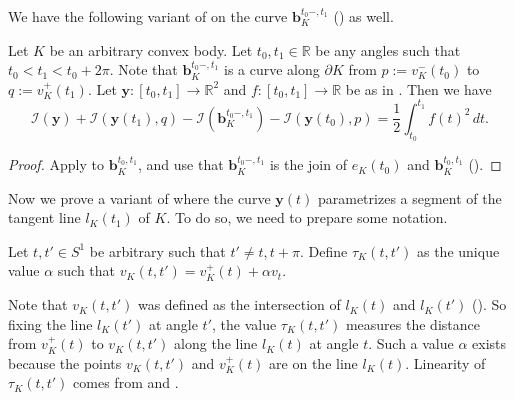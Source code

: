 We have the following variant of  on the curve \(\mathbf{b}_K^{t_0 -, t_1}\) () as well.

\begin{theorem}

Let \(K\) be an arbitrary convex body. Let \(t_0, t_1 \in \mathbb{R}\) be any angles such that \(t_0 < t_1 < t_0 + 2 \pi\). Note that \(\mathbf{b}_K^{t_0 -, t_1}\) is a curve along \(\partial K\) from \(p := v_K^-(t_0)\) to \(q := v_K^+(t_1)\). Let \(\mathbf{y} : [t_0, t_1] \to \mathbb{R}^2\) and \(f : [t_0, t_1] \to \mathbb{R}\) be as in . Then we have
\[
\mathcal{I}(\mathbf{y}) + \mathcal{I} \left( \mathbf{y}(t_1), q \right) - \mathcal{I}(\mathbf{b}_K^{t_0 -, t_1}) - \mathcal{I} \left( \mathbf{y}(t_0), p \right) =  \frac{1}{2}\int_{t_0}^{t_1} f(t) ^2 \, dt.
\]

\label{thm:mamikon-closed}
\end{theorem}

\begin{proof}
Apply  to \(\mathbf{b}_K^{t_0, t_1}\), and use that \(\mathbf{b}_{K}^{t_0 -, t_1}\) is the join of \(e_{K}(t_0)\) and \(\mathbf{b}_K^{t_0, t_1}\) ().
\end{proof}

Now we prove a variant of  where the curve \(\mathbf{y}(t)\) parametrizes a segment of the tangent line \(l_K(t_1)\) of \(K\). To do so, we need to prepare some notation.

\begin{definition}

Let \(t, t' \in S^1\) be arbitrary such that \(t' \neq t, t + \pi\). Define \(\tau_K(t, t')\) as the unique value \(\alpha\) such that \(v_K(t, t') = v_K^+(t) + \alpha v_t\).

\label{def:tangent-leg-length}
\end{definition}

Note that \(v_K(t, t')\) was defined as the intersection of \(l_K(t)\) and \(l_K(t')\) (). So fixing the line \(l_K(t')\) at angle \(t'\), the value \(\tau_K(t, t')\) measures the distance from \(v_K^+(t)\) to \(v_K(t, t')\) along the line \(l_K(t)\) at angle \(t\). Such a value \(\alpha\) exists because the points \(v_K(t, t')\) and \(v_K^+(t)\) are on the line \(l_K(t)\). Linearity of \(\tau_K(t, t')\) comes from  and .

